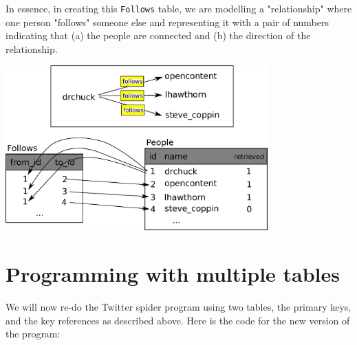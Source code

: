 \documentclass[11pt]{book}
\begin{document}
In essence, in creating this {\tt Follows} table, we are modelling a 
"relationship" where one person "follows" someone else
and representing it with a pair of numbers indicating that (a) the people are
connected and (b) the direction of the relationship.

\beforefig
\centerline{\includegraphics[height=2.50in]{figs2/twitter.eps}}
\afterfig


\section{Programming with multiple tables}

We will now re-do the Twitter spider program using two tables, the primary
keys, and the key references as described above.  Here is the code for 
the new version of the program:
\end{document}
